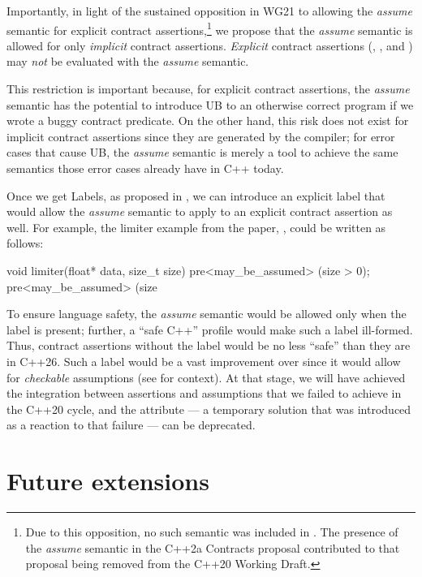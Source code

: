 Importantly, in light of the sustained opposition in WG21 to allowing the \emph{assume} semantic for explicit contract assertions,\footnote{Due to this opposition, no such semantic was included in \cite{P2900R14}. The presence of the \emph{assume} semantic in the C++2a Contracts proposal \cite{P0542R5} contributed to that proposal being removed from the C++20 Working Draft.} we propose that the \emph{assume} semantic is allowed for only \emph{implicit} contract assertions. \emph{Explicit} contract assertions (, , and ) may \emph{not} be evaluated with the \emph{assume} semantic.

This restriction is important because, for explicit contract assertions, the \emph{assume} semantic  has the potential to introduce UB to an otherwise correct program if we wrote a buggy contract predicate. On the other hand, this risk does not exist for implicit contract assertions since they are generated by the compiler; for error cases that cause UB, the \emph{assume} semantic is merely a tool to achieve the same semantics those error cases already have in C++ today.

Once we get Labels, as proposed in \cite{P3400R1}, we can introduce an explicit label that would allow the \emph{assume} semantic to apply to an explicit contract assertion as well. For example, the limiter example from the \tcode{[[assume]]} paper, \cite{P1774R8}, could be written as follows:
\begin{codeblock}
void limiter(float* data, size_t size)
  pre<may_be_assumed> (size > 0);
  pre<may_be_assumed> (size %
\end{codeblock}
To ensure language safety, the \emph{assume} semantic would be allowed only when the \mbox{} label is present; further, a ``safe C++'' profile would make such a label ill-formed. Thus, contract assertions without the label would be no less ``safe'' than they are in C++26. Such a label would be a vast improvement over \tcode{[[assume]]} since it would allow for \emph{checkable} assumptions (see \cite{P2064R0} for context). At that stage, we will have achieved the integration between assertions and assumptions that we failed to achieve in the C++20 cycle, and the \tcode{[[assume]]} attribute --- a temporary solution that was introduced as a reaction to that failure --- can be deprecated.

\section{Future extensions}
\label{ext}

